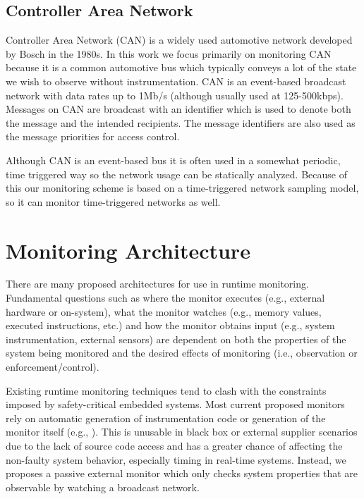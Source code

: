 \documentclass[]{llncs}
\begin{document}
\subsection{Controller Area Network}
Controller Area Network (CAN) is a widely used automotive network developed by Bosch in the 1980s. 
In this work we focus primarily on monitoring CAN because it is a common automotive bus which typically conveys a lot of the state we wish to observe without instrumentation.
%
CAN is an event-based broadcast network with data rates up to 1Mb/s (although usually used at 125-500kbps). Messages on CAN are broadcast with an identifier which is used to denote both the message and the intended recipients. The message identifiers are also used as the message priorities for access control.

Although CAN is an event-based bus it is often used in a somewhat periodic, time triggered way so the network usage can be statically analyzed. Because of this our monitoring scheme is based on a time-triggered network sampling model, so it can monitor time-triggered networks as well.

\section{Monitoring Architecture}
There are many proposed architectures for use in runtime monitoring. Fundamental questions such as where the monitor executes (e.g., external hardware or on-system), what the monitor watches (e.g., memory values, executed instructions, etc.) and how the monitor obtains input (e.g., system instrumentation, external sensors) are dependent on both the properties of the system being monitored and the desired effects of monitoring (i.e., observation or enforcement/control).  

Existing runtime monitoring techniques tend to clash with the constraints imposed by safety-critical embedded systems. 
Most current proposed monitors rely on automatic generation of instrumentation code or generation of the monitor itself (e.g., \cite{Havelund2002, Pike2011}).
This is unusable in black box or external supplier scenarios due to the lack of source code access and has a greater chance of affecting the non-faulty system behavior, especially timing in real-time systems.
Instead, we proposes a passive external monitor which only checks system properties that are observable by watching a broadcast network.
\end{document}

